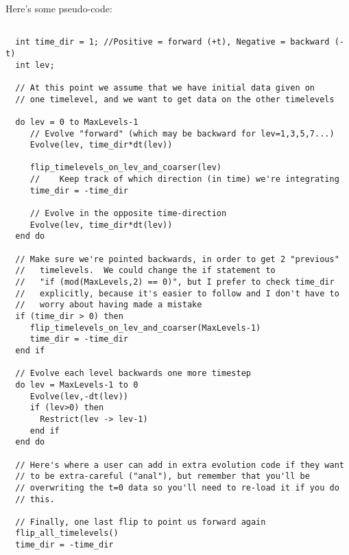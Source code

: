 \documentclass{article}
\begin{document}
Here's some pseudo-code:
\begin{verbatim}

  int time_dir = 1; //Positive = forward (+t), Negative = backward (-t)
  int lev;

  // At this point we assume that we have initial data given on
  // one timelevel, and we want to get data on the other timelevels

  do lev = 0 to MaxLevels-1
     // Evolve "forward" (which may be backward for lev=1,3,5,7...)
     Evolve(lev, time_dir*dt(lev))

     flip_timelevels_on_lev_and_coarser(lev)
     //    Keep track of which direction (in time) we're integrating
     time_dir = -time_dir

     // Evolve in the opposite time-direction
     Evolve(lev, time_dir*dt(lev))
  end do

  // Make sure we're pointed backwards, in order to get 2 "previous"
  //   timelevels.  We could change the if statement to 
  //   "if (mod(MaxLevels,2) == 0)", but I prefer to check time_dir 
  //   explicitly, because it's easier to follow and I don't have to
  //   worry about having made a mistake
  if (time_dir > 0) then
     flip_timelevels_on_lev_and_coarser(MaxLevels-1)
     time_dir = -time_dir
  end if

  // Evolve each level backwards one more timestep
  do lev = MaxLevels-1 to 0
     Evolve(lev,-dt(lev))
     if (lev>0) then
       Restrict(lev -> lev-1)
     end if
  end do

  // Here's where a user can add in extra evolution code if they want 
  // to be extra-careful ("anal"), but remember that you'll be 
  // overwriting the t=0 data so you'll need to re-load it if you do
  // this.   

  // Finally, one last flip to point us forward again
  flip_all_timelevels()
  time_dir = -time_dir
\end{verbatim}
\end{document}
